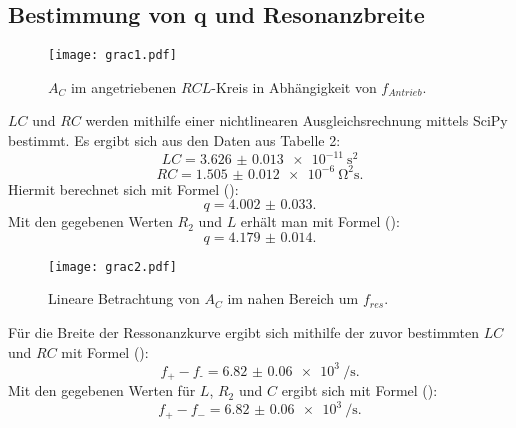 \subsection{Bestimmung von q und Resonanzbreite}
\begin{figure}[H]
	\centering
	\caption{$A_C$ im angetriebenen $RCL$-Kreis in Abhängigkeit von $f_{Antrieb}$.}
	\texttt{[image: grac1.pdf]}
	\label{fig:grac1}
\end{figure}
$LC$ und $RC$ werden mithilfe einer nichtlinearen Ausgleichsrechnung mittels SciPy \cite{scipy} bestimmt. Es ergibt sich aus den Daten aus Tabelle 2: 
\begin{displaymath}
LC = \SI{3.626(13)e-11}{\second\squared}
\end{displaymath}
\begin{displaymath}
RC = \SI{1.505(12)e-6}{\ohm\squared\second}\text{.}
\end{displaymath}
Hiermit berechnet sich mit Formel ():
\begin{displaymath}
q = \num{4.002(33)}\text{.}
\end{displaymath}
Mit den gegebenen Werten $R_2$ und $L$ erhält man mit Formel ():
\begin{displaymath}
q = \num{4.179(14)}\text{.}
\end{displaymath}


\begin{figure}[H]
	\centering
	\caption{Lineare Betrachtung von $A_C$ im nahen Bereich um $f_{res}$.}
	\texttt{[image: grac2.pdf]}
	\label{fig:grac2}
\end{figure}

Für die Breite der Ressonanzkurve ergibt sich mithilfe der zuvor bestimmten $LC$ und $RC$ mit Formel ():
\begin{displaymath}
f_\text{+} - f_\text{-} = \SI{6.82(6)e3}{\per\second}\text{.}
\end{displaymath}
Mit den gegebenen Werten für $L$, $R_2$ und $C$ ergibt sich mit Formel ():
\begin{displaymath}
f_+ - f_- = \SI{6.82(6)e3}{\per\second}\text{.}
\end{displaymath}



